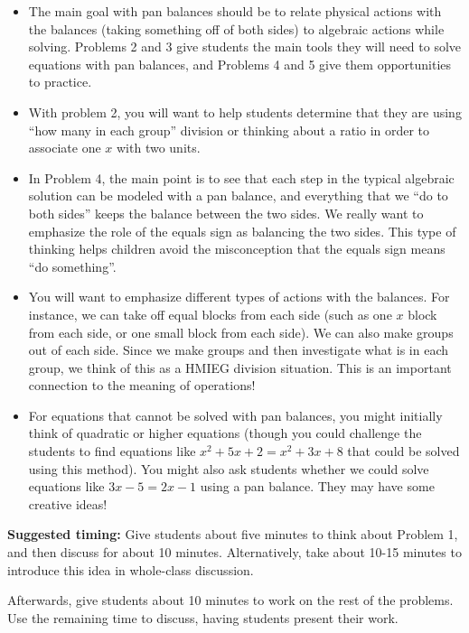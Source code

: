 \documentclass[nooutcomes,noauthor,handout]{ximera}
\begin{document}
\begin{instructorNotes}
\begin{itemize}
	\item The main goal with pan balances should be to relate physical actions with the balances (taking something off of both sides) to algebraic actions while solving. Problems 2 and 3 give students the main tools they will need to solve equations with pan balances, and Problems 4 and 5 give them opportunities to practice.
	\item With problem 2, you will want to help students determine that they are using ``how many in each group'' division or thinking about a ratio in order to associate one $x$ with two units.
	\item In Problem 4, the main point is to see that each step in the typical algebraic solution can be modeled with a pan balance, and everything that we ``do to both sides'' keeps the balance between the two sides. We really want to emphasize the role of the equals sign as balancing the two sides. This type of thinking helps children avoid the misconception that the equals sign means ``do something''.
	\item You will want to emphasize different types of actions with the balances. For instance, we can take off equal blocks from each side (such as one $x$ block from each side, or one small block from each side). We can also make groups out of each side. Since we make groups and then investigate what is in each group, we think of this as a HMIEG division situation. This is an important connection to the meaning of operations!
	\item For equations that cannot be solved with pan balances, you might initially think of quadratic or higher equations (though you could challenge the students to find equations like $x^2 + 5x + 2 = x^2 + 3x + 8$ that could be solved using this method). You might also ask students whether we could solve equations like $3x - 5 = 2x - 1$ using a pan balance. They may have some creative ideas!
\end{itemize}





{\bf Suggested timing:} Give students about five minutes to think about Problem 1, and then discuss for about 10 minutes. Alternatively, take about 10-15 minutes to introduce this idea in whole-class discussion.

Afterwards, give students about 10 minutes to work on the rest of the problems. Use the remaining time to discuss, having students present their work.

\end{instructorNotes}
\end{document}
